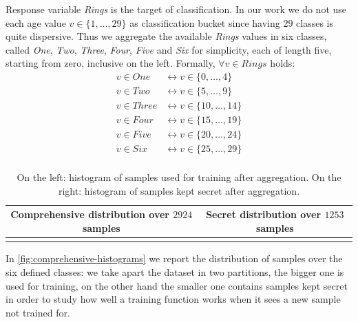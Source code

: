 \documentclass[10pt,a4paper]{article}
\begin{document}
    Response variable \emph{Rings} is the target of classification. 
    In our work we do not use each age value $v \in \lbrace 1, \ldots, 29 \rbrace$ 
    as classification bucket since having $29$ classes is quite dispersive.
    Thus we aggregate the available \emph{Rings} values in six classes, called \emph{One},
    \emph{Two}, \emph{Three}, \emph{Four}, \emph{Five} and \emph{Six} for simplicity, each of length five, 
    starting from zero, inclusive on the left. Formally, $\forall v \in Rings$ holds: 
    \begin{displaymath}
        \begin{split}
                v \in One &\leftrightarrow v \in \lbrace 0, \ldots, 4 \rbrace \\
                v \in Two &\leftrightarrow v \in \lbrace 5, \ldots, 9 \rbrace \\
                v \in Three &\leftrightarrow v \in \lbrace 10, \ldots, 14 \rbrace \\
                v \in Four &\leftrightarrow v \in \lbrace 15, \ldots, 19 \rbrace \\
                v \in Five &\leftrightarrow v \in \lbrace 20, \ldots, 24 \rbrace \\
                v \in Six &\leftrightarrow v \in \lbrace 25, \ldots, 29 \rbrace \\
        \end{split}
    \end{displaymath}

    \begin{table}
        \begin{tabular}{ c | c }
            Comprehensive distribution over $2924$ samples  &   Secret distribution over $1253$ samples \\
            \hline 
             &  \\
            \hline
        \end{tabular}
      \caption{On the left: histogram of samples used for training after aggregation.
        On the right: histogram of samples kept secret after aggregation.}
      \label{fig:comprehensive-histograms}
    \end{table}

    In \autoref{fig:comprehensive-histograms} we report the distribution of samples over
    the six defined classes: we take apart the dataset in two partitions, the bigger one is
    used for training, on the other hand the smaller one contains samples kept secret
    in order to study how well a training function works when it sees a new sample not
    trained for.
\end{document}
